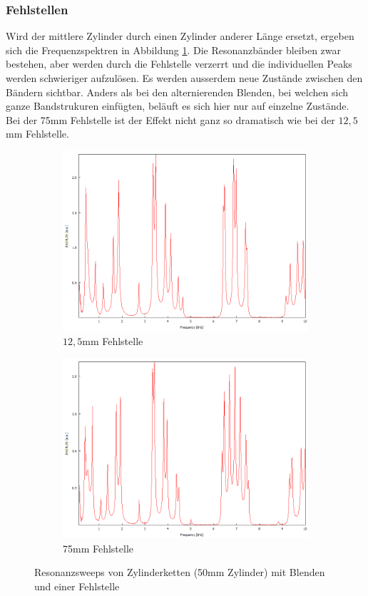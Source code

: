 \subsubsection{Fehlstellen}
Wird der mittlere Zylinder durch einen Zylinder anderer Länge ersetzt, ergeben sich die Frequenzspektren in Abbildung \ref{fig:zylinder_fehlstellen}.
Die Resonanzbänder bleiben zwar bestehen, aber werden durch die Fehlstelle verzerrt und die individuellen Peaks werden schwieriger aufzulösen.
Es werden ausserdem neue Zustände zwischen den Bändern sichtbar.
Anders als bei den alternierenden Blenden, bei welchen sich ganze Bandstrukuren einfügten, beläuft es sich hier nur auf einzelne Zustände.
Bei der 75mm Fehlstelle ist der Effekt nicht ganz so dramatisch wie bei der $12,5$mm Fehlstelle.
\begin{figure}
  \centering
  \begin{subfigure}{0.4\textwidth}
    \centering
    \includegraphics[width=\textwidth]{Bilder/Zylinderketten/unrein_12,5mm_mitte_doppel.png}
    \caption{$12,5$mm Fehlstelle}
  \end{subfigure}
  \begin{subfigure}{0.4\textwidth}
    \centering
    \includegraphics[width=\textwidth]{Bilder/Zylinderketten/unrein_75mm_mitte_doppel_7.png}
    \caption{75mm Fehlstelle}
  \end{subfigure}
  \caption{Resonanzsweeps von Zylinderketten (50mm Zylinder) mit Blenden und einer Fehlstelle}
  \label{fig:zylinder_fehlstellen}
\end{figure}